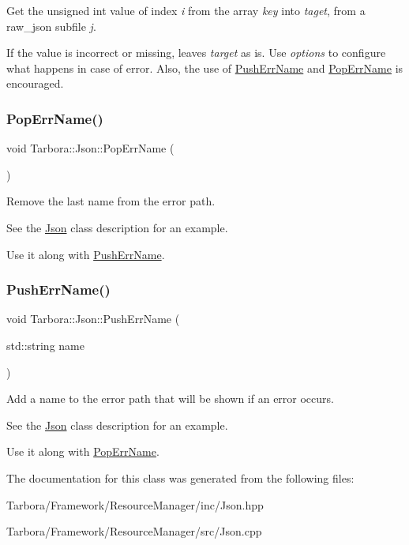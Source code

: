 Get the unsigned int value of index {\itshape i} from the array {\itshape key} into {\itshape taget}, from a raw\+\_\+json subfile {\itshape j}. 

If the value is incorrect or missing, leaves {\itshape target} as is. Use {\itshape options} to configure what happens in case of error. Also, the use of \hyperlink{classTarbora_1_1Json_a061eac4f16dac3b9b3a26a66de0ea8f0}{Push\+Err\+Name} and \hyperlink{classTarbora_1_1Json_a14019f06d3bd76edd6a6e78134519d11}{Pop\+Err\+Name} is encouraged. \mbox{\label{classTarbora_1_1Json_a14019f06d3bd76edd6a6e78134519d11}} 
\subsubsection{\texorpdfstring{Pop\+Err\+Name()}{PopErrName()}}
{\footnotesize\ttfamily void Tarbora\+::\+Json\+::\+Pop\+Err\+Name (\begin{DoxyParamCaption}{ }\end{DoxyParamCaption})}



Remove the last name from the error path. 

See the \hyperlink{classTarbora_1_1Json}{Json} class description for an example.

Use it along with \hyperlink{classTarbora_1_1Json_a061eac4f16dac3b9b3a26a66de0ea8f0}{Push\+Err\+Name}. \mbox{\label{classTarbora_1_1Json_a061eac4f16dac3b9b3a26a66de0ea8f0}} 
\subsubsection{\texorpdfstring{Push\+Err\+Name()}{PushErrName()}}
{\footnotesize\ttfamily void Tarbora\+::\+Json\+::\+Push\+Err\+Name (\begin{DoxyParamCaption}\item[{std\+::string}]{name }\end{DoxyParamCaption})}



Add a name to the error path that will be shown if an error occurs. 

See the \hyperlink{classTarbora_1_1Json}{Json} class description for an example.

Use it along with \hyperlink{classTarbora_1_1Json_a14019f06d3bd76edd6a6e78134519d11}{Pop\+Err\+Name}. 

The documentation for this class was generated from the following files\+:\begin{DoxyCompactItemize}
\item 
Tarbora/\+Framework/\+Resource\+Manager/inc/Json.\+hpp\item 
Tarbora/\+Framework/\+Resource\+Manager/src/Json.\+cpp\end{DoxyCompactItemize}
